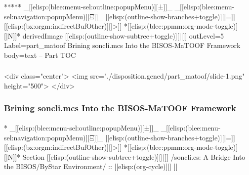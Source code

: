 \begin{whenOrg}
*****  _[[elisp:(blee:menu-sel:outline:popupMenu)][±]]_ _[[elisp:(blee:menu-sel:navigation:popupMenu)][Ξ]]_ [[elisp:(outline-show-branches+toggle)][|=]] [[elisp:(bx:orgm:indirectBufOther)][|>]] *[[elisp:(blee:ppmm:org-mode-toggle)][|N]]*  derivedImage [[elisp:(outline-show-subtree+toggle)][||]] outLevel=5 Label=part_matoof Brining soncli.mcs Into the BISOS-MaTOOF Framework body=text -- Part TOC

\end{whenOrg}

\begin{htmlonly}

\begin{frame}[fragile,plain,label=part_matoof]
    \frametitle{}
    \framesubtitle{}
    \begin{rawhtml}
<div class="center">
<img src="./disposition.gened/part_matoof/slide-1.png" height="500">
</div>
    \end{rawhtml}
\end{frame}
\end{htmlonly}

\begin{verblatex}

\begin{frame}[fragile,label=part_matoof]
    \frametitle{Brining soncli.mcs Into the BISOS-MaTOOF Framework}
    \framesubtitle{}

    \tableofcontents


\end{frame}
\end{verblatex}


\begin{whenOrg}
*  _[[elisp:(blee:menu-sel:outline:popupMenu)][±]]_ _[[elisp:(blee:menu-sel:navigation:popupMenu)][Ξ]]_ [[elisp:(outline-show-branches+toggle)][|=]] [[elisp:(bx:orgm:indirectBufOther)][|>]] *[[elisp:(blee:ppmm:org-mode-toggle)][|N]]*  Section    [[elisp:(outline-show-subtree+toggle)][||]]   /soncli.cs: A Bridge Into the BISOS/ByStar Environment/ ::  [[elisp:(org-cycle)][| ]]
\end{whenOrg}

